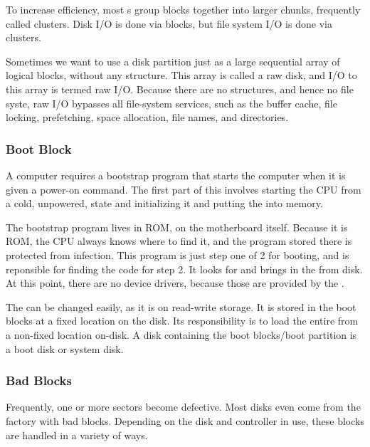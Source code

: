 To increase efficiency, most s group blocks together into larger chunks, frequently called clusters.
Disk I/O is done via blocks, but file system I/O is done via clusters.

Sometimes we want to use a disk partition just as a large sequential array of logical blocks, without any structure.
This array is called a raw disk, and I/O to this array is termed raw I/O.
Because there are no structures, and hence no file syste, raw I/O bypasses all file-system services, such as the buffer cache, file locking, prefetching, space allocation, file names, and directories.

\subsubsection{Boot Block}\label{subsubsec:Boot_Block}
A computer requires a bootstrap program that starts the computer when it is given a power-on command.
The first part of this involves starting the CPU from a cold, unpowered, state and initializing it and putting the  into memory.

The bootstrap program lives in ROM, on the motherboard itself.
Because it is ROM, the CPU always knows where to find it, and the program stored there is protected from infection.
This program is just step one of 2 for booting, and is reponsible for finding the code for step 2.
It looks for and brings in the  from disk.
At this point, there are no device drivers, because those are provided by the .

The  can be changed easily, as it is on read-write storage.
It is stored in the boot blocks at a fixed location on the disk.
Its responsibility is to load the entire  from a non-fixed location on-disk.
A disk containing the boot blocks/boot partition is a boot disk or system disk.

\subsubsection{Bad Blocks}\label{subsubsec:Bad_Blocks}
Frequently, one or more sectors become defective.
Most disks even come from the factory with bad blocks.
Depending on the disk and controller in use, these blocks are handled in a variety of ways.

